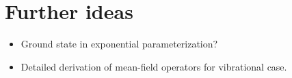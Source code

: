 \documentclass[aip,jcp,preprint,superscriptaddress,nofootinbib]{revtex4-1}
\begin{document}


\section{Further ideas}
\begin{itemize}
    \item Ground state in exponential parameterization?
    \item Detailed derivation of mean-field operators for vibrational case.
\end{itemize}

\newpage

\end{document}
